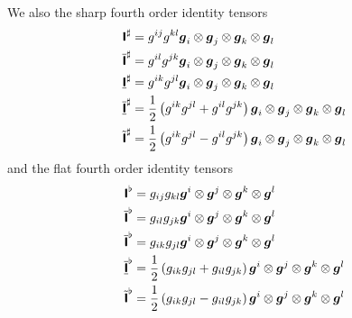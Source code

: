 We also the sharp fourth order identity tensors
\begin{equation}
  \begin{aligned}
       \boldsymbol{\mathsf{ I }}  ^{\sharp} &=g^{ij}g^{kl} \boldsymbol{g}_{i} \otimes \boldsymbol{g}_{j} \otimes \boldsymbol{g}_{k} \otimes \boldsymbol{g}_{l} \\
       \overline{\boldsymbol{\mathsf{ I }}}  ^{\sharp} &=g^{il}g^{jk} \boldsymbol{g}_{i} \otimes \boldsymbol{g}_{j} \otimes \boldsymbol{g}_{k} \otimes \boldsymbol{g}_{l} \\
       \underline{\boldsymbol{\mathsf{ I }}}  ^{\sharp} &=g^{ik}g^{jl} \boldsymbol{g}_{i} \otimes \boldsymbol{g}_{j} \otimes \boldsymbol{g}_{k} \otimes \boldsymbol{g}_{l} \\
       \overline{\underline{\boldsymbol{\mathsf{ I }}}}  ^{\sharp} &=\dfrac{1}{2}\left( g^{ik}g^{jl}+g^{il}g^{jk} \right) \boldsymbol{g}_{i} \otimes \boldsymbol{g}_{j} \otimes \boldsymbol{g}_{k} \otimes \boldsymbol{g}_{l} \\
       \tilde{\boldsymbol{\mathsf{ I }}}  ^{\sharp} &=\dfrac{1}{2}\left( g^{ik}g^{jl}-g^{il}g^{jk} \right) \boldsymbol{g}_{i} \otimes \boldsymbol{g}_{j} \otimes \boldsymbol{g}_{k} \otimes \boldsymbol{g}_{l} 
  \end{aligned}
\end{equation}
and the flat fourth order identity tensors
\begin{equation}
  \begin{aligned}
      \boldsymbol{\mathsf{ I }}  ^{\flat}&=g_{ij}g_{kl} \boldsymbol{g}^{i} \otimes \boldsymbol{g}^{j} \otimes \boldsymbol{g}^{k} \otimes \boldsymbol{g}^{l} \\
      \overline{\boldsymbol{\mathsf{ I }}}  ^{\flat}&=g_{il}g_{jk} \boldsymbol{g}^{i} \otimes \boldsymbol{g}^{j} \otimes \boldsymbol{g}^{k} \otimes \boldsymbol{g}^{l} \\
      \overline{\boldsymbol{\mathsf{ I }}}  ^{\flat}&=g_{ik}g_{jl} \boldsymbol{g}^{i} \otimes \boldsymbol{g}^{j} \otimes \boldsymbol{g}^{k} \otimes \boldsymbol{g}^{l} \\
      \overline{\underline{\boldsymbol{\mathsf{ I }}}}  ^{\flat}&=\dfrac{1}{2}\left( g_{ik}g_{jl}+g_{il}g_{jk} \right) \boldsymbol{g}^{i} \otimes \boldsymbol{g}^{j} \otimes \boldsymbol{g}^{k} \otimes \boldsymbol{g}^{l} \\
      \tilde{\boldsymbol{\mathsf{ I }}}  ^{\flat}&=\dfrac{1}{2}\left( g_{ik}g_{jl}-g_{il}g_{jk} \right) \boldsymbol{g}^{i} \otimes \boldsymbol{g}^{j} \otimes \boldsymbol{g}^{k} \otimes \boldsymbol{g}^{l} 
  \end{aligned}
\end{equation}

